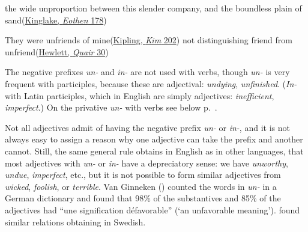 \ea \label{ex:13-16}
the wide unproportion between this slender company, and the boundless plain of sand\hfill(\href{https://www.gutenberg.org/files/43684/43684-h/43684-h.htm#page193}{Kinglake, \textit{Eothen} 178})
\z 

\ea \label{ex:13-17}
\ea
They were unfriends of mine\hfill(\href{https://archive.org/details/kimkipling01kipluoft/page/238/mode/2up?q=unfriends&view=theater}{Kipling, \textit{Kim} 202})
\ex
not distinguishing friend from unfriend\hfill(\href{https://archive.org/details/queensquairorsi00hewlgoog/page/30/mode/2up?q=%22distinguishing+friend%22&view=theater}{Hewlett, \textit{Quair} 30}) 
\z
\z


The negative prefixes \textit{un-} and \textit{in-} are not used with verbs, though \textit{un-} is very frequent with participles, because these are adjectival: \textit{undying}, \textit{unfinished}. (\textit{In-} with Latin participles, which in English are simply adjectives: \textit{inefficient}, \textit{imperfect}.) On the privative \textit{un-} with verbs see below p.~\pageref{privative_un}.

Not all adjectives admit of having the negative prefix \textit{un-} or \textit{in-}, and it is not always easy to assign a reason why one adjective can take the prefix and another cannot. Still, the same general rule obtains in English as in other languages, that most adjectives with \textit{un-} or \textit{in-} have a depreciatory sense: we have \textit{unworthy}, \textit{undue}, \textit{imperfect}, etc., but it is not possible to form similar adjectives from \textit{wicked}, \textit{foolish}, or \textit{terrible}. Van Ginneken (\citeyear[208 \S240]{vanginneken1907principes}) %
counted the words in 
\textit{un-} in a German dictionary and found that 98\% of the substantives and 85\% of the adjectives had ``une signification défavorable'' (`an unfavorable meaning'). \citet[\S567]{noreen1904vartsprak} 
found similar relations obtaining in 
Swedish.

